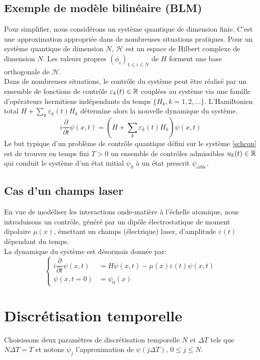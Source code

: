 \subsection{Exemple de modèle bilinéaire (BLM)}
Pour simplifier, nous considérons un système quantique de dimension finie. C'est une approximation appropriée dans de nombreuses situations pratiques. Pour un système quantique de dimension $N$, $\mathcal{H}$ est un espace de Hilbert complexe de dimension $N$. Les valeurs propres $(\phi_{i})_{1 \leq i \leq N}$ de $H$ forment une base orthogonale de $\mathcal{H}$.\\
Dans de nombreuses situations, le contrôle du système peut être réalisé par un ensemble de fonctions de contrôle $\varepsilon_{k}(t) \in \mathbb R$ couplées au système via une famille d'opérateurs hermitiens indépendants du temps $\{H_k, k=1,2,...\}$. L'Hamiltonien total $H+\sum_{k} \varepsilon_{k}(t)H_k$ détermine alors la nouvelle dynamique du système.
\begin{equation} \label{schcon}
i \dfrac{\partial }{\partial t} \psi (x,t) = (H+\sum_{k} \varepsilon_{k}(t)H_k)\psi (x,t)
\end{equation}
Le but typique d'un problème de contrôle quantique défini sur le système \eqref{schcon} est de trouver en temps fini $T > 0$ un ensemble de contrôles admissibles $u_k(t) \in \mathbb R$ qui conduit le système d'un état initial $\psi_0$ à un état prescrit $\psi_{cible}$.
\subsection{Cas d'un champs laser}
En vue de modéliser les interactions onde-matière à l'échelle atomique, nous introduisons un contrôle, généré par un dipôle électrostatique de moment dipolaire $\mu (x)$, émettant un champs (électrique) laser, d'amplitude $\varepsilon (t)$ dépendant du temps.\\
La dynamique du système est désormais donnée par:
\begin{equation} \label{schcon2}
\begin{cases}
i \dfrac{\partial }{\partial t} \psi (x,t) &= H\psi (x,t)-\mu(x)\varepsilon(t)\psi (x,t) \\
\psi (x,t=0) &= \psi_0(x)
\end{cases}
\end{equation}

\section{Discrétisation temporelle}
Choisissons deux paramètres de discrétisation temporelle $N$ et $\Delta T$ tels que $N \Delta T = T$ et notons $\psi_j$ l'approximation de $\psi(j\Delta T)$, $0 \leq j \leq N$.

